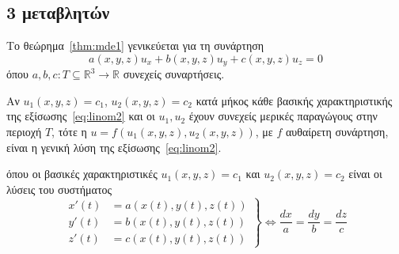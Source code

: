 \subsection*{3 μεταβλητών}

Το θεώρημα~\ref{thm:mde1} γενικεύεται για τη συνάρτηση 
\begin{equation}\label{eq:linom2}
  \boxed{a(x,y,z)u_{x} + b(x,y,z)u_{y} + c(x,y,z)u_{z}=0}
\end{equation}
όπου $ a,b,c \colon T \subseteq \mathbb{R}^{3} \to \mathbb{R}$ συνεχείς συναρτήσεις. 
\begin{mybox2}
  \begin{thm}\label{thm:mde11}
    Αν $ u_{1}(x,y,z)=c_{1} $, $ u_{2}(x,y,z)=c_{2} $ κατά μήκος κάθε βασικής
    χαρακτηριστικής της εξίσωσης~\eqref{eq:linom2} και οι $u_{1}, u_{2} $ έχουν συνεχείς 
    μερικές παραγώγους στην περιοχή $T$, τότε η $ u=f(u_{1}(x,y,z), u_{2}(x,y,z)) $, 
  με $f$ αυθαίρετη συνάρτηση, είναι η γενική λύση της εξίσωσης~\eqref{eq:linom2}.
\end{thm}
\end{mybox2}
όπου οι βασικές χαρακτηριστικές $ u_{1}(x,y,z)=c_{1} $ και $ u_{2}(x,y,z)=c_{2} $ είναι 
οι λύσεις του συστήματος 
\[
  \left.
    \begin{aligned}
      x'(t)&=a(x(t),y(t),z(t)) \\
      y'(t)&=b(x(t),y(t),z(t)) \\
      z'(t)&=c(x(t),y(t),z(t)) 
    \end{aligned} 
  \right\} \Leftrightarrow \frac{dx}{a} = \frac{dy}{b} = \frac{dz}{c}
\]

